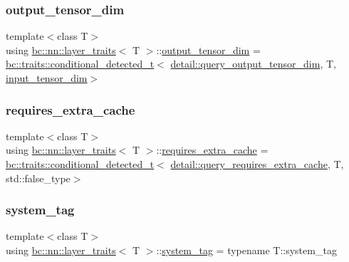 \subsubsection{\texorpdfstring{output\+\_\+tensor\+\_\+dim}{output\_tensor\_dim}}
{\footnotesize\ttfamily template$<$class T$>$ \\
using \hyperlink{structbc_1_1nn_1_1layer__traits}{bc\+::nn\+::layer\+\_\+traits}$<$ T $>$\+::\hyperlink{structbc_1_1nn_1_1layer__traits_adee5a74fd6b7ae72f1bcfb483f2e3fd4}{output\+\_\+tensor\+\_\+dim} =  \hyperlink{namespacebc_1_1traits_a1a6d378947ec32acd457890854bcd592}{bc\+::traits\+::conditional\+\_\+detected\+\_\+t}$<$ \hyperlink{namespacebc_1_1nn_1_1detail_aa16772b430fc14eb1bf4b82ad6f679fd}{detail\+::query\+\_\+output\+\_\+tensor\+\_\+dim}, T, \hyperlink{structbc_1_1nn_1_1layer__traits_ad59c13867670e4e117d657881bc2afe8}{input\+\_\+tensor\+\_\+dim}$>$}

\mbox{\label{structbc_1_1nn_1_1layer__traits_a7702010ac1dd6f1776bdc089e62c5da4}} 
\subsubsection{\texorpdfstring{requires\+\_\+extra\+\_\+cache}{requires\_extra\_cache}}
{\footnotesize\ttfamily template$<$class T$>$ \\
using \hyperlink{structbc_1_1nn_1_1layer__traits}{bc\+::nn\+::layer\+\_\+traits}$<$ T $>$\+::\hyperlink{structbc_1_1nn_1_1layer__traits_a7702010ac1dd6f1776bdc089e62c5da4}{requires\+\_\+extra\+\_\+cache} =  \hyperlink{namespacebc_1_1traits_a1a6d378947ec32acd457890854bcd592}{bc\+::traits\+::conditional\+\_\+detected\+\_\+t}$<$ \hyperlink{namespacebc_1_1nn_1_1detail_a7cfff1896ea5ef55f6410bb7c6ff3bf3}{detail\+::query\+\_\+requires\+\_\+extra\+\_\+cache}, T, std\+::false\+\_\+type$>$}

\mbox{\label{structbc_1_1nn_1_1layer__traits_a95a88b919abd7c9ebe295a3f5171b31e}} 
\subsubsection{\texorpdfstring{system\+\_\+tag}{system\_tag}}
{\footnotesize\ttfamily template$<$class T$>$ \\
using \hyperlink{structbc_1_1nn_1_1layer__traits}{bc\+::nn\+::layer\+\_\+traits}$<$ T $>$\+::\hyperlink{structbc_1_1nn_1_1layer__traits_a95a88b919abd7c9ebe295a3f5171b31e}{system\+\_\+tag} =  typename T\+::system\+\_\+tag}



